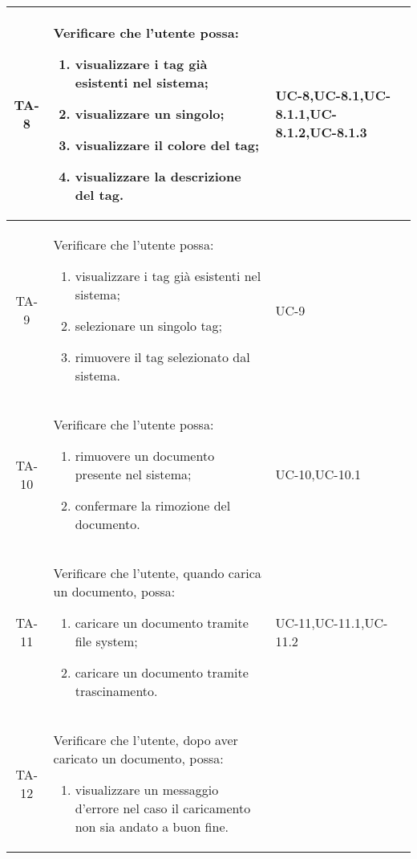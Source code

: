 \begin{xltabular}{\textwidth}{| c | X | X | c |}
    \hline
    TA-8 & Verificare che l’utente possa:
    \begin{enumerate}
        \item visualizzare i tag già esistenti nel sistema;
        \item visualizzare un singolo;
        \item visualizzare il colore del tag;
        \item visualizzare la descrizione del tag.
    \end{enumerate}& UC-8,\newline UC-8.1,\newline UC-8.1.1,\newline UC-8.1.2,\newline UC-8.1.3 & \textcolor{xmarkcolor}{} \\
    \hline
     TA-9 & Verificare che l’utente possa:
    \begin{enumerate}
        \item visualizzare i tag già esistenti nel sistema;
        \item selezionare un singolo tag;
        \item rimuovere il tag selezionato dal sistema.
        
    \end{enumerate}& UC-9 & \textcolor{xmarkcolor}{} \\
    \hline
     TA-10 & Verificare che l’utente possa:
    \begin{enumerate}
        \item rimuovere un documento presente nel sistema;
        \item confermare la rimozione del documento.
        
    \end{enumerate}& UC-10,\newline UC-10.1 & \textcolor{xmarkcolor}{} \\
    \hline
    TA-11 & Verificare che l’utente, quando carica un documento, possa:
    \begin{enumerate}
        \item caricare un documento tramite file system;
        \item caricare un documento tramite trascinamento.
        
    \end{enumerate}& UC-11,\newline UC-11.1,\newline UC-11.2 & \textcolor{xmarkcolor}{} \\
    \hline
    TA-12 & Verificare che l’utente, dopo aver caricato un documento, possa:
    \begin{enumerate}
        \item visualizzare un messaggio d'errore nel caso il caricamento non sia andato a buon fine.
        

\end{enumerate}
\end{xltabular}
